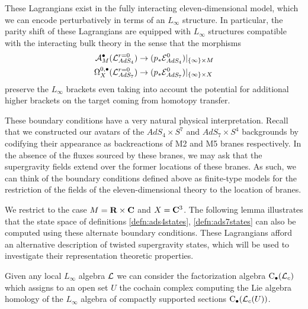 \documentclass[../main.tex]{subfiles}
\begin{document}
These Lagrangians exist in the fully interacting eleven-dimensional model, which we can encode perturbatively in terms of an $L_\infty$ structure.
In particular, the parity shift of these Lagrangians are equipped with $L_\infty$ structures compatible with the interacting bulk theory in the sense that the morphisms
\begin{align*}
\mathcal A_M^\bullet (\mathcal{L}^{r=0}_{AdS_4} ) & \to (p_* \mathcal{E}^0 _{AdS_4})|_{\{\infty\} \times M}\\
\Omega^{0,\bullet}_{X} (\mathcal{L}^{r=0}_{AdS_7} ) & \to (p_* \mathcal{E}^0 _{AdS_7})|_{\{\infty\} \times X}
\end{align*}
preserve the $L_\infty$ brackets even taking into account the potential for additional higher brackets on the target coming from homotopy transfer. 

\begin{rmk}
These boundary conditions have a very natural physical interpretation. Recall that we constructed our avatars of the $AdS_4\times S^7$ and $AdS_7\times S^4$ backgrounds by codifying their appearance as backreactions of M2 and M5 branes respectively. In the absence of the fluxes sourced by these branes, we may ask that the supergravity fields extend over the former locations of these branes. As such, we can think of the boundary conditions defined above as finite-type models for the restriction of the fields of the eleven-dimensional theory to the location of branes. 
\end{rmk}

\parsec[]

We restrict to the case $M = \mathbf{R} \times \mathbf{C}$ and $X = \mathbf{C}^3$.
The following lemma illustrates that the state space of definitions \ref{defn:ads4states}, \ref{defn:ads7states} can also be computed using these alternate boundary conditions.
These Lagrangians afford an alternative description of twisted supergravity states, which will be used to investigate their representation theoretic properties.

Given any local $L_\infty$ algebra $\mathcal L$ we can consider the factorization algebra ${\mathrm{C}}_\bullet(\mathcal L_c)$ which assigns to an open set $U$ the cochain complex computing the Lie algebra homology of the $L_\infty$ algebra of compactly supported sections ${\mathrm{C}}_\bullet (\mathcal L_c(U))$.


\end{document}
